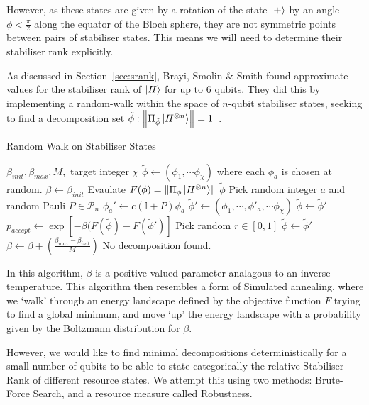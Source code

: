 \documentclass{standalone}
\begin{document}
However, as these states are given by a rotation of the state $\ket{+}$ by an angle $\phi<\frac{\pi}{2}$ along the equator of the Bloch sphere, they are not symmetric points between pairs of stabiliser states. This means we will need to determine their stabiliser rank explicitly. 
\par
As discussed in Section~\ref{sec:srank}, Brayi, Smolin \& Smith found approximate values for the stabiliser rank of $\ket{H}$ for up to $6$ qubits. They did this by implementing a random-walk within the space of $n$-qubit stabiliser states, seeking to find a decomposition set $\tilde{\phi}:\norm{\Pi_{\tilde{\phi}}\ket{H^{\otimes n}}}=1$~\cite{Bravyi2015}. \par
\begin{algorithm}[!h]
\caption{Random Walk on Stabiliser States}
\begin{algorithmic}[1]
\Require $\beta_{init},\beta_{max},M,$ target integer $\chi$
\State $\tilde{\phi} \leftarrow \left(\phi_{1},\cdots\phi_{\chi}\right)$ where each $\phi_{a}$ is chosen at random.
\State $\beta \leftarrow \beta_{init}$
        \State Evaulate $F(\tilde{\phi})=\norm{\Pi_{\phi}\ket{H^{\otimes n}}}$
            \State \Return $\tilde{\phi}$
        \EndIf
        \State Pick random integer $a$ and random Pauli $P\in\mathcal{P}_{n}$
        \State $\phi_{a}'\leftarrow c\left(\mathbb{I}+P\right)\phi_{a}$
        \State $\tilde{\phi}' \leftarrow (\phi_{1},\cdots,\phi'_{a},\cdots\phi_{\chi})$
            \State $\tilde{\phi}\leftarrow\tilde{\phi}'$
        \Else
            \State $p_{accept}\leftarrow \exp[-\beta(F(\tilde{\phi})-F(\tilde{\phi}')]$
            \State Pick random $r\in [0,1]$
                \State $\tilde{\phi}\leftarrow\tilde{\phi}'$
            \EndIf
        \EndIf
    \EndFor
    \State $\beta\leftarrow \beta + \left( \frac{\beta_{max}-\beta_{init}}{M} \right)$
\EndWhile
\State \Return No decomposition found.
\end{algorithmic}
\end{algorithm}
In this algorithm, $\beta$ is a positive-valued parameter analagous to an inverse temperature. This algorithm then resembles a form of Simulated annealing, where we `walk' througb an energy landscape defined by the objective function $F$ trying to find a global minimum, and move `up' the energy landscape with a probability given by the Boltzmann distribution for $\beta$.
\par
However, we would like to find minimal decompositions deterministically for a small number of qubits to be able to state categorically the relative Stabiliser Rank of different resource states. We attempt this using two methods: Brute-Force Search, and a resource measure called Robustness.
\end{document}
